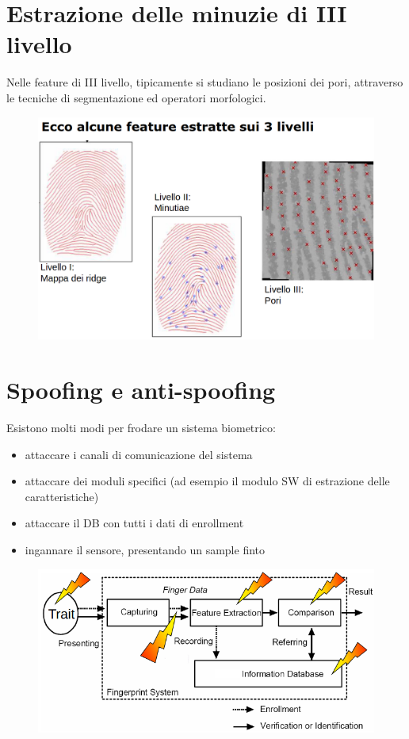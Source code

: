 \section{Estrazione delle minuzie di III livello}

Nelle feature di III livello, tipicamente si studiano
le posizioni dei pori, attraverso le tecniche di segmentazione ed operatori morfologici.

\begin{figure}[ht]
    \centering
    \includegraphics[width=1\linewidth]{chapters/images-chap6/es-conclusivo.png}
\end{figure}

\newpage
\section{Spoofing e anti-spoofing}
Esistono molti modi per frodare un sistema biometrico:
\begin{itemize}
    \item attaccare i canali di comunicazione del sistema
    \item attaccare dei moduli specifici (ad esempio il modulo SW di estrazione delle caratteristiche)
    \item attaccare il DB con tutti i dati di enrollment
    \item ingannare il sensore, presentando un sample finto
\end{itemize}

\begin{figure}[ht]
    \centering
    \includegraphics[width=0.75\linewidth]{chapters/images-chap6/frodare.png}
\end{figure}


